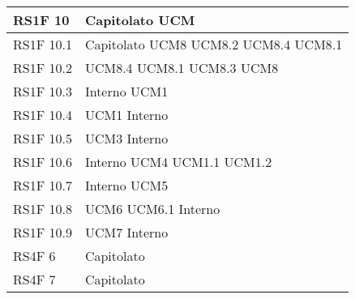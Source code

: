 \begin{center}
\begin{longtable}{ | p{5cm} | p{5cm} |}
        RS1F 10 &  Capitolato \newline  UCM \newline  \\ \hline      
        RS1F 10.1 &  Capitolato \newline  UCM8 \newline  UCM8.2 \newline  UCM8.4 \newline  UCM8.1 \newline  \\ \hline      
        RS1F 10.2 &  UCM8.4 \newline  UCM8.1 \newline  UCM8.3 \newline  UCM8 \newline  \\ \hline      
        RS1F 10.3 &  Interno \newline  UCM1 \newline  \\ \hline      
        RS1F 10.4 &  UCM1 \newline  Interno \newline  \\ \hline      
        RS1F 10.5 &  UCM3 \newline  Interno \newline  \\ \hline      
        RS1F 10.6 &  Interno \newline  UCM4 \newline  UCM1.1 \newline  UCM1.2 \newline  \\ \hline      
        RS1F 10.7 &  Interno \newline  UCM5 \newline  \\ \hline      
        RS1F 10.8 &  UCM6 \newline  UCM6.1 \newline  Interno \newline  \\ \hline      
        RS1F 10.9 &  UCM7 \newline  Interno \newline  \\ \hline      
        RS4F 6 &  Capitolato \newline  \\ \hline      
        RS4F 7 &  Capitolato \newline  \\ \hline      

\end{longtable}
\end{center}
